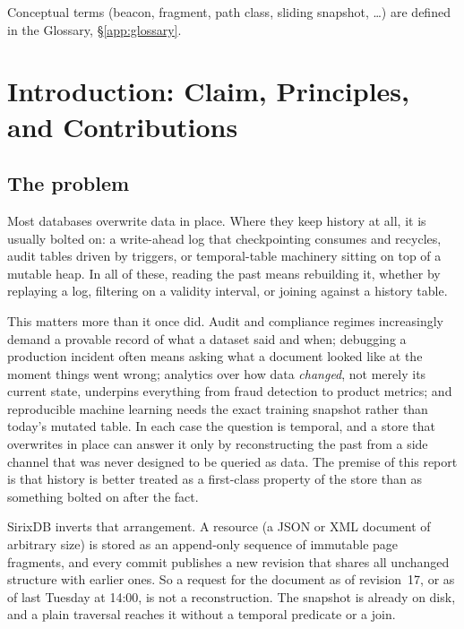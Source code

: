 \documentclass[11pt,a4paper,oneside]{report}
\theoremstyle{sirixthm}
\begin{document}
\vspace{0.6cm}
\noindent\small Conceptual terms (beacon, fragment, path class, sliding snapshot, \ldots) are
defined in the Glossary, \S\ref{app:glossary}.
\cleardoublepage

\chapter{Introduction: Claim, Principles, and Contributions}
\label{ch:intro}

\section{The problem}

Most databases overwrite data in place. Where they keep history at all, it is usually
bolted on: a write-ahead log that checkpointing consumes and recycles, audit tables
driven by triggers, or temporal-table machinery sitting on top of a mutable heap. In all
of these, reading the past means rebuilding it, whether by replaying a log, filtering on
a validity interval, or joining against a history table.

This matters more than it once did. Audit and compliance regimes increasingly demand a provable record
of what a dataset said and when; debugging a production incident often means asking what a document
looked like at the moment things went wrong; analytics over how data \emph{changed}, not merely its
current state, underpins everything from fraud detection to product metrics; and reproducible machine
learning needs the exact training snapshot rather than today's mutated table. In each case the question
is temporal, and a store that overwrites in place can answer it only by reconstructing the past from a
side channel that was never designed to be queried as data. The premise of this report is that history
is better treated as a first-class property of the store than as something bolted on after the fact.

SirixDB inverts that arrangement. A resource (a JSON or XML document of arbitrary size)
is stored as an append-only sequence of immutable page fragments, and every commit
publishes a new revision that shares all unchanged structure with earlier ones. So a
request for the document as of revision~17, or as of last Tuesday at 14:00, is not a
reconstruction. The snapshot is already on disk, and a plain traversal reaches it without
a temporal predicate or a join.
\end{document}

